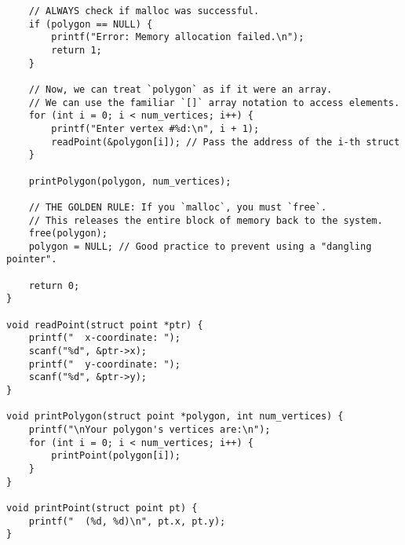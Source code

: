 \documentclass[11pt]{book}
\begin{document}
\begin{verbatim}
    // ALWAYS check if malloc was successful.
    if (polygon == NULL) {
        printf("Error: Memory allocation failed.\n");
        return 1;
    }

    // Now, we can treat `polygon` as if it were an array.
    // We can use the familiar `[]` array notation to access elements.
    for (int i = 0; i < num_vertices; i++) {
        printf("Enter vertex #%d:\n", i + 1);
        readPoint(&polygon[i]); // Pass the address of the i-th struct
    }

    printPolygon(polygon, num_vertices);

    // THE GOLDEN RULE: If you `malloc`, you must `free`.
    // This releases the entire block of memory back to the system.
    free(polygon);
    polygon = NULL; // Good practice to prevent using a "dangling pointer".

    return 0;
}

void readPoint(struct point *ptr) {
    printf("  x-coordinate: ");
    scanf("%d", &ptr->x);
    printf("  y-coordinate: ");
    scanf("%d", &ptr->y);
}

void printPolygon(struct point *polygon, int num_vertices) {
    printf("\nYour polygon's vertices are:\n");
    for (int i = 0; i < num_vertices; i++) {
        printPoint(polygon[i]);
    }
}

void printPoint(struct point pt) {
    printf("  (%d, %d)\n", pt.x, pt.y);
}

\end{verbatim}
\end{document}

